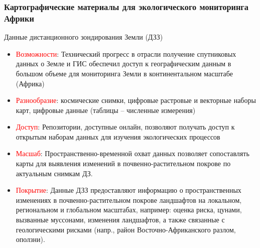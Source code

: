 \documentclass[pdflatex,compress,8pt,
	xcolor={dvipsnames,dvipsnames,svgnames,x11names,table},
	hyperref={colorlinks = true, breaklinks = true, urlcolor = NavyBlue, linkcolor=white, breaklinks = true}]{beamer}
\begin{document}
\begin{frame}\frametitle{Картографические материалы для экологического мониторинга Африки}

\begin{exampleblock}{Данные дистанционного зондирования Земли (ДЗЗ)}
\begin{itemize}	
	\item \textcolor{red}{Возможности}: Технический прогресс в отрасли получение спутниковых данных о Земле и ГИС  обеспечил доступ к географическим данным в большом объеме для мониторинга Земли в континентальном масштабе (Африка)
	\item \textcolor{red}{Разнообразие}: космические снимки, цифровые растровые и векторные наборы карт, цифровые данные (таблицы -- численные измерения)
	\item \textcolor{red}{Доступ}: Репозитории, доступные онлайн, позволяют получать доступ к открытым наборам данных для изучения экологических процессов 
	\item \textcolor{red}{Масшаб}: Пространственно-временной охват данных позволяет сопоставлять карты для выявления изменений в почвенно-растительном покрове по актуальным снимкам ДЗ.
	\item \textcolor{red}{Покрытие}: Данные ДЗЗ предоставляют информацию о пространственных изменениях в почвенно-растительном покрове ландшафтов на локальном, региональном и глобальном масштабах, например: оценка риска, цунами, вызванные муссонами, изменения ландшафтов, а также связанные с геологическими рисками (напр., район Восточно-Африканского разлом, оползни).
	\end{itemize}
\end{exampleblock}
\end{frame}
\end{document}
